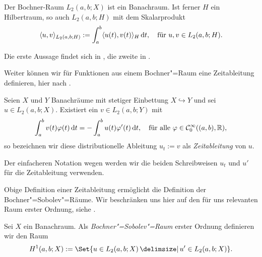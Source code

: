 \documentclass[../main.tex]{subfiles}
\begin{document}
\begin{Lemma}
\label{lemma:bochnerraum_ist_banachraum_bzw_hilbertraum}
    Der Bochner-Raum $L_{2}(a, b; X)$ ist ein Banachraum.
    Ist ferner $H$ ein Hilbertraum, so auch $L_{2}(a, b; H)$ mit dem Skalarprodukt
    \begin{equation}
        \skp{u}{v}{L_{2}(a, b; H)} := \int_{a}^{b} \skp{u(t)}{v(t)}{H} \diff t, \quad \text{für}~u,v \in L_{2}(a, b; H).
    \end{equation}

    \begin{Beweis}
        Die erste Aussage findet sich in \cite[Proposition XVIII.1.1]{Dautray:1992by}, die zweite in \cite[Abschnitt 1.1.3]{Lions:1972tg}.
    \end{Beweis}
\end{Lemma}

Weiter können wir für Funktionen aus einem Bochner"=Raum eine Zeitableitung definieren, hier nach \cites[471]{Dautray:1992by}[Definition 10.6]{Schweizer2013}.

\begin{Definition}%
\label{definition:zeitableitung}
    Seien $X$ und $Y$ Banachräume mit stetiger Einbettung $X \hookrightarrow Y$ und sei $u \in L_{2}(a, b; X)$.
    Existiert ein $v \in L_{2}(a, b; Y)$ mit
    \begin{equation}
        \int_{a}^{b} v(t) \varphi(t) \diff t = - \int_{a}^{b} u(t) \varphi'(t) \diff t, \quad \fa \varphi \in \mathcal C^{\infty}_{0}((a, b), \mathbb{R}),
    \end{equation}
    so bezeichnen wir diese distributionelle Ableitung $u_{t} := v$ als \emph{Zeitableitung} von $u$.
\end{Definition}

\begin{Bemerkung}
    Der einfacheren Notation wegen werden wir die beiden Schreibweisen $u_{t}$ und $u'$ für die Zeitableitung verwenden.
\end{Bemerkung}

Obige Definition einer Zeitableitung ermöglicht die Definition der Bochner"=Sobolev"=Räume.
Wir beschränken uns hier auf den für uns relevanten Raum erster Ordnung, siehe \cite[Section 5.9.2]{evans2010partial}.

\begin{Definition}
\label{definition:bochner_sobolev_raum}
    Sei $X$ ein Banachraum.
    Als \emph{Bochner"=Sobolev"=Raum} erster Ordnung definieren wir den Raum
    \begin{equation}
        H^{1}(a, b; X) := \Set{u \in L_{2}(a, b; X) \given u' \in L_{2}(a, b; X)}.
    \end{equation}
\end{Definition}
\end{document}
